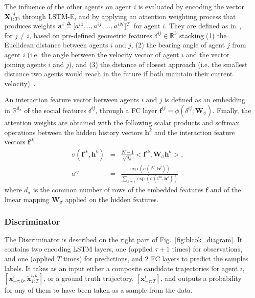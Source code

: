 \documentclass[10pt,twocolumn,letterpaper]{article}
\def\delequal{\mathrel{\ensurestackMath{\stackon[1pt]{=}{\scriptstyle\Delta}}}}
\begin{document}
The influence of the other agents on agent $i$ is evaluated by encoding the vector $\mathbf X^{\neg i}_{1:T}$, through LSTM-E, and by applying an attention weighting process that produces weights $\mathbf a^i\delequal [a^{i1},..,a^{ij},...,a^{iN}]^T$ for agent $i$. They are defined as in~\cite{SoPhie2018}, for $j\neq i$, based on pre-defined geometric features $\delta^{ij} \in \mathbb{R}^3$ stacking (1) the Euclidean distance between agents $i$ and $j$, (2) the bearing angle of agent $j$ from agent $i$ (i.e. the angle between the velocity vector of agent $i$ and the vector joining agents $i$ and $j$), and (3) the distance of closest approach (i.e. the smallest distance two agents would reach in the future if both maintain their current velocity)~\cite{Kooij2014ContextBasedPP}.

An interaction feature vector between agents $i$ and $j$ is defined as an embedding in $\mathbb{R}^{d_\sigma}$ of the social features $\delta^{ij}$, through a FC layer $\mathbf f^{ij} = \phi(\delta^{ij};\mathbf W_\phi)$. Finally, the attention weights are obtained with the following scalar products and softmax operations between the hidden history vectors $\mathbf h^k$ and the interaction feature vectors $\mathbf f^{ik}$  
{\small
\begin{eqnarray}
\sigma(\mathbf f^{ik},\mathbf h^k) &=& \frac{N-1}{\sqrt{d_\sigma}} <\mathbf f^{ik},\mathbf W_\sigma \mathbf h^k>,\\
a^{ij} &=& \frac{\exp(\sigma(\mathbf f^{ij},\mathbf h^j))}{\sum_{k\neq i}\exp(\sigma(\mathbf f^{ik},\mathbf h^k))}
\end{eqnarray}}
\noindent where $d_\sigma$ is the common number of rows of the embedded features $\mathbf f$ and of the linear mapping $\mathbf W_\sigma$ applied on the hidden features.


\subsubsection{Discriminator}

The Discriminator is described on the right part of Fig.~\ref{fig:blcok_diagram}. It contains two encoding LSTM layers,  one (applied $\tau+1$ times) for observations, and one (applied $T$ times) for predictions, and 2 FC layers to predict the samples labels. It takes as an input either a composite candidate trajectories for agent $i$, $[{\mathbf{x}}^{i}_{-\tau:0},\tilde{\mathbf{x}}^{i,k}_{1: T}]$, or a ground truth trajectory, $[{\mathbf{x}}^{i}_{-\tau:T}]$, and outputs a probability for any of them to have been taken as a sample from the data.
\end{document}
